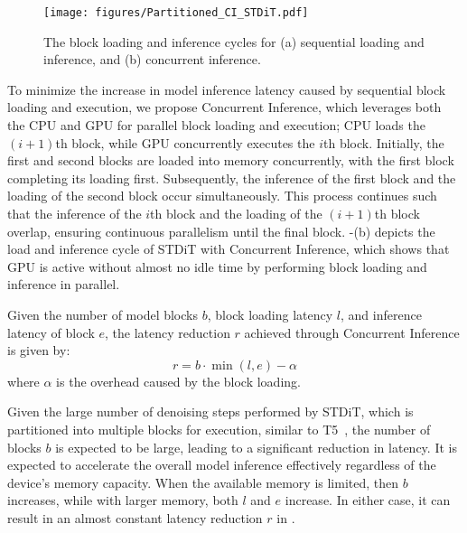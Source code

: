 \begin{figure}[!ht]
    \centering
    \texttt{[image: figures/Partitioned\_CI\_STDiT.pdf]}
    \caption{The block loading and inference cycles for (a) sequential loading and inference, and (b) concurrent inference. %
    }
    \label{fig:Partitioned_CI_STDiT}
\end{figure}

To minimize the increase in model inference latency caused by sequential block loading and execution, we propose Concurrent Inference, which leverages both the CPU and GPU for parallel block loading and execution; CPU loads the $(i+1)$th block, while GPU concurrently executes the $i$th block. Initially, the first and second blocks are loaded into memory concurrently, with the first block completing its loading first. Subsequently, the inference of the first block and the loading of the second block occur simultaneously. This process continues such that the inference of the $i$th block and the loading of the $(i+1)$th block overlap, ensuring continuous parallelism until the final block. -(b) depicts the load and inference cycle of STDiT with Concurrent Inference, which shows that GPU is active without almost no idle time by performing block loading and inference in parallel.

Given the number of model blocks $b$, block loading latency $l$, and inference latency of block $e$, the latency reduction $r$ achieved through Concurrent Inference is given by:
\begin{equation}
    r = b \cdot \min (l, e) - \alpha
    \label{eq:concurrent_inference}
\end{equation}
where $\alpha$ is the overhead caused by the block loading. 

Given the large number of denoising steps performed by STDiT, which is partitioned into multiple blocks for execution, similar to T5~\cite{raffel2020exploring}, the number of blocks $b$ is expected to be large, leading to a significant reduction in latency. It is expected to accelerate the overall model inference effectively regardless of the device's memory capacity. When the available memory is limited, then $b$ increases, while with larger memory, both $l$ and $e$ increase. In either case, it can result in an almost constant latency reduction $r$ in .

